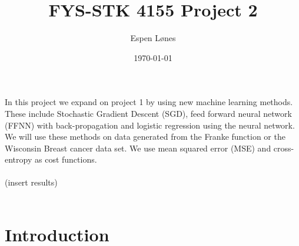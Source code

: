 \documentclass[12pt, letterpaper, twoside]{article}
\begin{document}
\title{FYS-STK 4155 Project 2 }
\author{Espen Lønes}
\date{\today}
\maketitle
In this project we expand on project 1 by using new machine learning methods.
These include Stochastic Gradient Descent (SGD), feed forward neural network (FFNN) with back-propagation and logistic regression using the neural network.
We will use these methods on data generated from the Franke function or the Wisconsin Breast cancer data set.
We use mean squared error (MSE) and cross-entropy as cost functions.
\ \\
\ \\
(insert results)
\ \\
\ \\
\section{Introduction}
\end{document}
